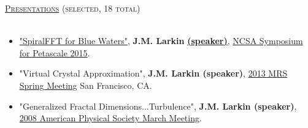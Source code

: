 \documentclass{article}
\newcommand{\lineunder}{\vspace*{-8pt} \\ \hspace*{-18pt} \hrulefill \\}
\newcommand{\header}[1]{{\hspace*{-15pt}\vspace*{6pt} \textsc{#1}} \vspace*{-6pt} \lineunder}
\newenvironment{achievements}{\begin{list}{$\bullet$}{\topsep 0pt \itemsep -2pt}}{\vspace*{4pt}\end{list}}
\begin{document}
\header{\Large{\href{http://jasonlarkin.org/pres.html}{Presentations} (selected, 18 total)}}
\begin{itemize}[leftmargin=*]
\item \href{https://bluewaters.ncsa.illinois.edu/documents/10157/5a0a0d37-95bf-460b-a7f0-cfadd15abec8}{"SpiralFFT for Blue Waters"}, \textbf{J.M. Larkin} \href{https://www.youtube.com/watch?v=rjbEWeu2Nwc&feature=youtu.be#t=51m53s}{\textbf{(speaker)}}, \href{https://bluewaters.ncsa.illinois.edu/paid-ime#SPIRAL FFT}{NCSA Symposium for Petascale 2015}.
\item "Virtual Crystal Approximation", \textbf{J.M. Larkin (speaker)}, \href{http://www.mrs.org/spring2013/}{2013 MRS Spring Meeting} San Francisco, CA.
\item "Generalized Fractal Dimensions...Turbulence", \textbf{J.M. Larkin (speaker)}, \href{http://meetings.aps.org/Meeting/MAR08/Content/1017}{2008 American Physical Society March Meeting}.

\end{itemize}



\end{document}
